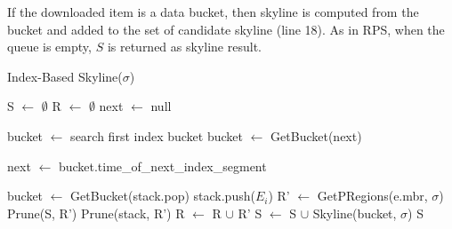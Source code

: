 If the downloaded item is a data bucket, then skyline is computed from the bucket and added to the set of candidate skyline (line 18). As in RPS, when the queue is empty, $S$ is returned as skyline result.

\begin{algorithm}
\caption{Index-Based Skyline($\sigma$)} \label{alg:IBSkyline}
\begin{algorithmic}[1]

\STATE S $\gets$ $\emptyset$
\STATE R $\gets$ $\emptyset$
\REPEAT
    \STATE next $\gets$ null

        \STATE bucket $\gets$ search first index bucket
    \ELSE
        \STATE bucket $\gets$ GetBucket(next)
    \ENDIF

        \STATE next $\gets$ bucket.time\_of\_next\_index\_segment
    \ENDIF

            \STATE bucket $\gets$ GetBucket(stack.pop)
        \ENDIF
                    \STATE stack.push($E_i$)
                    \STATE R' $\gets$ GetPRegions(e.mbr, $\sigma$)
                    \STATE Prune(S, R')
                    \STATE Prune(stack, R')
                    \STATE R $\gets$ R $\cup$ R'
                \ENDIF
            \ENDFOR
        \ELSE
            \STATE S $\gets$ S $\cup$ Skyline(bucket, $\sigma$)
        \ENDIF
    \ENDWHILE
{}
\RETURN S
\end{algorithmic}
\end{algorithm}

%



